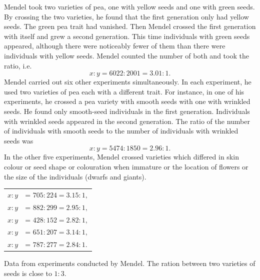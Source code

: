 Mendel took two varieties of pea, one with yellow seeds and one with
green seeds. By crossing the two varieties, he found that the first
generation only had yellow seeds. The green pea trait had vanished.
Then Mendel crossed the first generation with itself and grew a second
generation. This time individuals with green seeds appeared, although
there were noticeably fewer of them than there were individuals with
yellow seeds. Mendel counted the number of both and took the ratio,
i.e.
\begin{equation*}%
x:y = 6022:2001 = 3.01:1.
\end{equation*}
Mendel carried out six other experiments simultaneously. In each
experiment, he used two varieties of pea each with a different trait. For
instance, in one of his experiments, he crossed a pea variety with smooth
seeds with one with wrinkled seeds. He found only smooth-seed
individuals in the first generation. Individuals with wrinkled seeds
appeared in the second generation. The ratio of the number of
individuals with smooth seeds to the number of individuals with
wrinkled seeds was
\begin{equation*}%
x:y = 5474:1850 = 2.96:1.
\end{equation*}
In the other five experiments, Mendel crossed varieties which differed
in skin colour or seed shape or colouration when immature or the
location of flowers or the size of the individuals (dwarfs and giants).

\begin{margintable}
\begin{tabular}{ll}%
$x:y$ & = $705:224  = 3.15:1,$ \\
$x:y$ & = $882:299  = 2.95:1,$ \\
$x:y$ & = $428:152  = 2.82:1,$ \\
$x:y$ & = $651:207 = 3.14:1,$ \\
$x:y$ & = $787:277  = 2.84:1.$
\end{tabular}
\caption{Data from experiments conducted by Mendel. The ration between two varieties of seeds is close to $1:3$.\label{mendel-result}}
\end{margintable}




